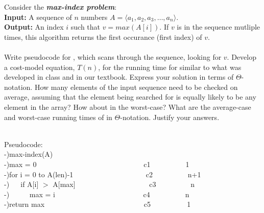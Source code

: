 \documentclass[11pt]{article}
\begin{document}
%
%
\begin{questions}
\question[10]
Consider the {\bf {\em max-index problem}}:\\
{\bf Input: } A sequence of $n$ numbers $A=\langle a_1, a_2, a_3, \dots, a_n\rangle$.\\
{\bf Output:} An index $i$ such that $v = max(A[i])$.  If $v$ is in the sequence mutliple times, this algorithm returns the first occurance (first index) of $v$.\\\\
Write pseudocode for , which scans through the sequence, looking for $v$.  Develop a cost-model equation, $T(n)$, for the running time for  similar to what was developed in class and in our textbook.  Express your solution in terms of $\Theta$-notation.  How many elements of the input sequence need to be checked on average, assuming that the element being searched for is equally likely to be any element in the array?  How about in the worst-case?  What are the average-case and worst-case running times of  in $\Theta$-notation.  Justify your answers.
\begin{solutionorbox} \\
	Pseudocode:\\
	-)max-index(A) \\
	-)max = 0 $\hspace{55pt}$ $\hspace{55pt}$ $\hspace{54pt}$ c1 $\hspace{55pt}$1\\
	-)for i = 0 to A(len)-1 $\hspace{55pt}$ $\hspace{55pt}$ c2 $\hspace{55pt}$n+1  \\
	-) $\hspace{15pt}$if A[i] $>$ A[max] $\hspace{55pt}$ $\hspace{57pt}$ c3$\hspace{58pt}$n\\
	 -)$\hspace{15pt}$ $\hspace{15pt}$max = i  $\hspace{95pt}$ $\hspace{30pt}$$\hspace{15pt}$c4 $\hspace{55pt}$n \\
	-)return max $\hspace{55pt}$ $\hspace{55pt}$ $\hspace{45pt}$c5 $\hspace{53pt}$ 1 \\


\end{solutionorbox}
\end{questions}
\end{document}
